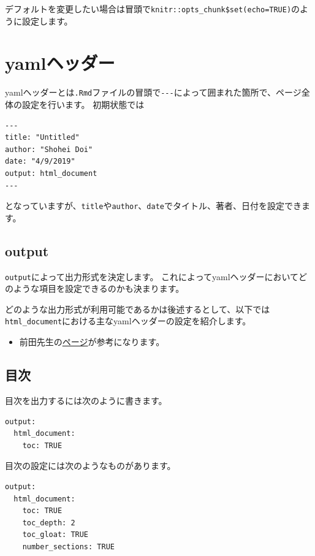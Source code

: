 \documentclass[]{bxjsreport}
\providecommand{\tightlist}{%
  \setlength{\itemsep}{0pt}\setlength{\parskip}{0pt}}
\let\asdf\section
\renewcommand{\section}{\chapter}
\let\asdff\subsection
\renewcommand{\subsection}{\asdf}
\renewcommand{\subsubsection}{\asdff}
\begin{document}
デフォルトを変更したい場合は冒頭で\texttt{knitr::opts\_chunk\$set(echo=TRUE)}のように設定します。

\hypertarget{YAML}{%
\subsection{yamlヘッダー}\label{YAML}}

yamlヘッダーとは\texttt{.Rmd}ファイルの冒頭で\texttt{-\/-\/-}によって囲まれた箇所で、ページ全体の設定を行います。
初期状態では

\begin{verbatim}
---
title: "Untitled"
author: "Shohei Doi"
date: "4/9/2019"
output: html_document
---
\end{verbatim}

となっていますが、\texttt{title}や\texttt{author}、\texttt{date}でタイトル、著者、日付を設定できます。

\hypertarget{output}{%
\subsubsection{output}\label{output}}

\texttt{output}によって出力形式を決定します。
これによってyamlヘッダーにおいてどのような項目を設定できるのかも決まります。

どのような出力形式が利用可能であるかは後述するとして、以下では\texttt{html\_document}における主なyamlヘッダーの設定を紹介します。

\begin{itemize}
\tightlist
\item
  前田先生の\href{https://qiita.com/kazutan/items/726e03dfcef1615ae999}{ページ}が参考になります。
\end{itemize}

\hypertarget{ux76eeux6b21}{%
\subsubsection{目次}\label{ux76eeux6b21}}

目次を出力するには次のように書きます。

\begin{verbatim}
output:
  html_document:
    toc: TRUE
\end{verbatim}

目次の設定には次のようなものがあります。

\begin{verbatim}
output:
  html_document:
    toc: TRUE
    toc_depth: 2
    toc_gloat: TRUE
    number_sections: TRUE
\end{verbatim}
\end{document}
